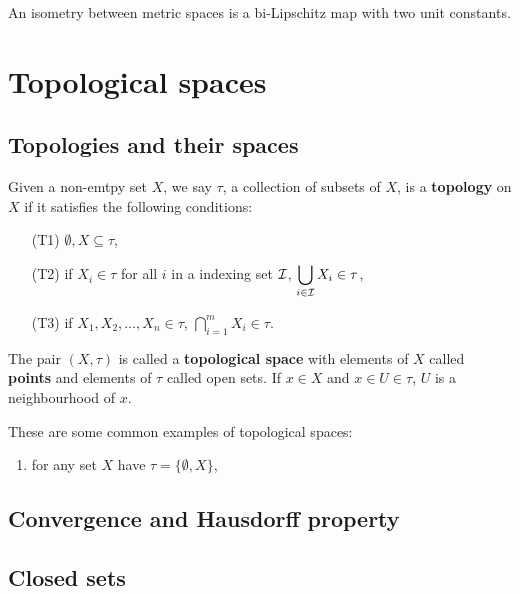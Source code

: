\documentclass[../Year2.tex]{subfiles}
\begin{document}
\begin{remark}
    An isometry between metric spaces is a bi-Lipschitz map with two unit constants.
\end{remark}

\section{Topological spaces}

\subsection{Topologies and their spaces}

\begin{definition}[Topology]
    Given a non-emtpy set $X$, we say $\tau$, a collection of subsets of $X$, is a \textbf{topology} on $X$ if it satisfies the following conditions: \begin{enumerate}
        \item[(T1)] $\emptyset,X\subseteq\tau$,
        \item[(T2)] if $X_i\in\tau$ for all $i$ in a indexing set $\mathcal{I}$, $\displaystyle \bigcup_{i\in\mathcal{I}}X_i\in\tau$,
        \vspace{-17pt}
        \item[(T3)] if $X_1,X_2,\ldots,X_n\in\tau$, $\displaystyle \bigcap_{i=1}^m X_i\in\tau$.
    \end{enumerate}
    \vspace{-10pt}
    The pair $(X,\tau)$ is called a \textbf{topological space} with elements of $X$ called \textbf{points} and elements of $\tau$ called open sets. If $x\in X$ and $x\in U\in\tau$, $U$ is a neighbourhood of $x$.
\end{definition}

\begin{examples}
    These are some common examples of topological spaces: \begin{enumerate}
        \item for any set $X$ have $\tau=\{\emptyset, X\}$,
    \end{enumerate}
\end{examples}

\subsection{Convergence and Hausdorff property}

\subsection{Closed sets}
\end{document}
